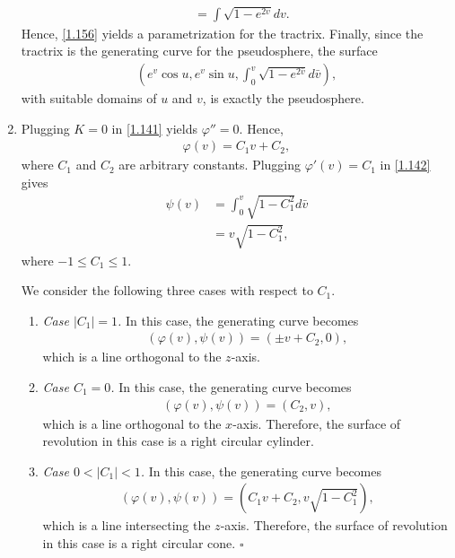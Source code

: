 \documentclass[a4paper]{article}
\numberwithin{equation}{section}
\begin{document}
\begin{enumerate}
\begin{align}
& = \int {\sqrt {1 - {e^{2v}}} dv} .
\end{align}
Hence, \eqref{1.156} yields a parametrization for the tractrix. Finally, since the tractrix is the generating curve for the pseudosphere, the surface 
\begin{align}
\left( {{e^v}\cos u,{e^v}\sin u,\int_0^v {\sqrt {1 - {e^{2\bar v}}} d\bar v} } \right),
\end{align}
with suitable domains of $u$ and $v$, is exactly the pseudosphere.
\item Plugging $K=0$ in \eqref{1.141} yields $\varphi '' =0$. Hence, 
\begin{align}
\varphi \left( v \right) = {C_1}v + {C_2},
\end{align}
where $C_1$ and $C_2$ are arbitrary constants. Plugging $\varphi '\left(v\right) = C_1$ in \eqref{1.142} gives
\begin{align}
\psi \left( v \right) &= \int_0^v {\sqrt {1 - C_1^2} d\bar v} \\
 &= v\sqrt {1 - C_1^2} ,
\end{align}
where $-1\le C_1\le 1$. 

We consider the following three cases with respect to $C_1$.
\begin{enumerate}
\item \textit{Case $\left| {{C_1}} \right| = 1$.} In this case, the generating curve becomes 
\begin{align}
\left( {\varphi \left( v \right),\psi \left( v \right)} \right) = \left( { \pm v + {C_2},0} \right),
\end{align}
which is a line orthogonal to the $z$-axis.
\item \textit{Case $C_1 =0$.} In this case, the generating curve becomes
\begin{align}
\left( {\varphi \left( v \right),\psi \left( v \right)} \right) = \left( {{C_2},v} \right),
\end{align}
which is a line orthogonal to the $x$-axis. Therefore, the surface of revolution in this case is a right circular cylinder.
\item \textit{Case $0 < \left| {{C_1}} \right| < 1$.} In this case, the generating curve becomes
\begin{align}
\left( {\varphi \left( v \right),\psi \left( v \right)} \right) = \left( {{C_1}v + {C_2},v\sqrt {1 - C_1^2} } \right),
\end{align}
which is a line intersecting the $z$-axis. Therefore, the surface of revolution in this case is a right circular cone. \hfill $\square$
\end{enumerate}
\end{enumerate}
\end{document}
